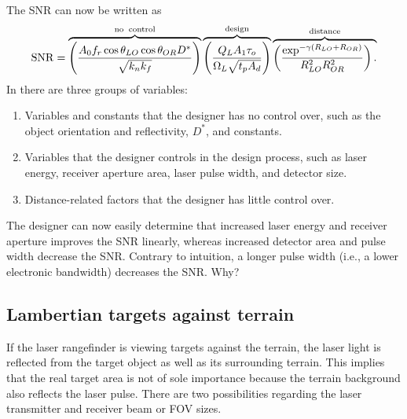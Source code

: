 The SNR can now be written as
\begin{equation}
\operatorname{SNR} = 
\overbrace{
\left(\frac{A_0f_r  \cos\theta_{LO} \cos\theta_{OR} D^\ast }{\sqrt{k_nk_f}}\right)
}^{\rm no\;\;control}
\overbrace{
\left(\frac{Q_L A_1 \tau_o }{\Omega_L\sqrt{t_p A_d}}\right)
}^{\rm design}
\overbrace{
\left(\frac{\exp^{-\gamma (R_{LO}+R_{OR})} }{R^2_{LO}R^2_{OR}}\right).\\
}^{\rm distance}
\label{lrfd2}
\end{equation}
In  there are three groups of variables:

\begin{enumerate}[1.]

\item 
Variables and constants that the designer has no control over, such as the object orientation and reflectivity, $D^\ast$, and constants.

\item 
Variables that the designer controls in the design process, such as laser energy, receiver aperture area, laser pulse width, and detector size.

\item 
Distance-related factors that the designer has little control over.

\end{enumerate}

The designer can now easily determine that increased laser energy and receiver aperture improves the SNR linearly, whereas increased detector area and pulse width decrease the SNR. Contrary to intuition, a longer pulse width (i.e., a lower electronic bandwidth) decreases the SNR. Why?


\subsection{Lambertian targets against terrain}
\noindent
If the laser rangefinder is viewing targets against the terrain, the laser light is reflected from the target object as well as its  surrounding terrain. This implies that the real target area is not of sole importance because the terrain background also reflects the laser pulse. There are two possibilities regarding the laser transmitter and receiver beam or FOV sizes.



